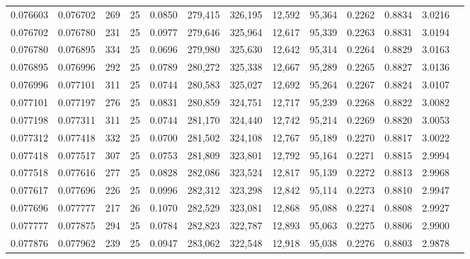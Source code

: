 \begin{tabular}{rrrrrrrrrrrrr}
0.076603 & 0.076702 &   269 &  25 &                                     0.0850 & 279,415 & 326,195 &  12,592 &  95,364 & 0.2262 & 0.8834 & 3.0216 \\
0.076702 & 0.076780 &   231 &  25 &                                     0.0977 & 279,646 & 325,964 &  12,617 &  95,339 & 0.2263 & 0.8831 & 3.0194 \\
0.076780 & 0.076895 &   334 &  25 &                                     0.0696 & 279,980 & 325,630 &  12,642 &  95,314 & 0.2264 & 0.8829 & 3.0163 \\
0.076895 & 0.076996 &   292 &  25 &                                     0.0789 & 280,272 & 325,338 &  12,667 &  95,289 & 0.2265 & 0.8827 & 3.0136 \\
0.076996 & 0.077101 &   311 &  25 &                                     0.0744 & 280,583 & 325,027 &  12,692 &  95,264 & 0.2267 & 0.8824 & 3.0107 \\
0.077101 & 0.077197 &   276 &  25 &                                     0.0831 & 280,859 & 324,751 &  12,717 &  95,239 & 0.2268 & 0.8822 & 3.0082 \\
0.077198 & 0.077311 &   311 &  25 &                                     0.0744 & 281,170 & 324,440 &  12,742 &  95,214 & 0.2269 & 0.8820 & 3.0053 \\
0.077312 & 0.077418 &   332 &  25 &                                     0.0700 & 281,502 & 324,108 &  12,767 &  95,189 & 0.2270 & 0.8817 & 3.0022 \\
0.077418 & 0.077517 &   307 &  25 &                                     0.0753 & 281,809 & 323,801 &  12,792 &  95,164 & 0.2271 & 0.8815 & 2.9994 \\
0.077518 & 0.077616 &   277 &  25 &                                     0.0828 & 282,086 & 323,524 &  12,817 &  95,139 & 0.2272 & 0.8813 & 2.9968 \\
0.077617 & 0.077696 &   226 &  25 &                                     0.0996 & 282,312 & 323,298 &  12,842 &  95,114 & 0.2273 & 0.8810 & 2.9947 \\
0.077696 & 0.077777 &   217 &  26 &                                     0.1070 & 282,529 & 323,081 &  12,868 &  95,088 & 0.2274 & 0.8808 & 2.9927 \\
0.077777 & 0.077875 &   294 &  25 &                                     0.0784 & 282,823 & 322,787 &  12,893 &  95,063 & 0.2275 & 0.8806 & 2.9900 \\
0.077876 & 0.077962 &   239 &  25 &                                     0.0947 & 283,062 & 322,548 &  12,918 &  95,038 & 0.2276 & 0.8803 & 2.9878 \\

\end{tabular}
